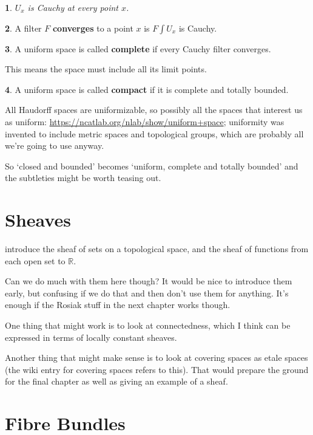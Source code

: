 \documentclass[oneside,english]{amsbook}
\numberwithin{section}{chapter}
\theoremstyle{plain}
\newtheorem{thm}{\protect\theoremname}
\theoremstyle{definition}
\newtheorem{defn}[thm]{\protect\definitionname}
\providecommand{\definitionname}{Definition}
\providecommand{\theoremname}{Theorem}
\begin{document}
\begin{thm}
	$U_x$ is Cauchy at every point $x$.
\end{thm}

\begin{defn}
	A filter $F$ \textbf{converges} to a point $x$ is $F\int U_x$ is Cauchy.
\end{defn}

\begin{defn}
	A uniform space is called \textbf{complete} if every Cauchy filter converges.
\end{defn}

This means the space must include all its limit points. 

\begin{defn}
	A uniform space is called \textbf{compact} if it is complete and totally bounded.
\end{defn}

All Haudorff spaces are uniformizable, so possibly all the spaces that interest us as uniform: \url{https://ncatlab.org/nlab/show/uniform+space}; uniformity was invented to include metric spaces and topological groups, which are probably all we're going to use anyway. 

So `closed and bounded' becomes `uniform, complete and totally bounded' and the subtleties might be worth teasing out.


\chapter{Sheaves}

introduce the sheaf of sets on a topological space, and the sheaf of functions from each open set to $\mathbb{R}$.

Can we do much with them here though? It would be nice to introduce them early, but confusing if we do that and then don't use them for anything. It's enough if the Rosiak stuff in the next chapter works though.

One thing that might work is to look at connectedness, which I think can be expressed in terms of locally constant sheaves.

Another thing that might make sense is to look at covering spaces as etale spaces (the wiki entry for covering spaces refers to this). That would prepare the ground for the final chapter as well as giving an example of a sheaf.

\chapter{Fibre Bundles}
\end{document}
